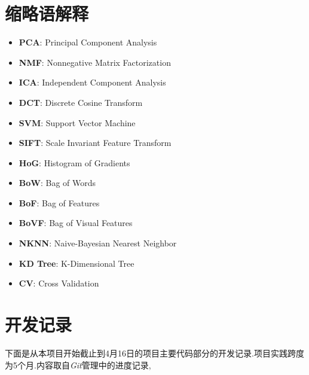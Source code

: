 

\chapter{缩略语解释}
\begin{itemize}
	\item \textbf{PCA}: Principal Component Analysis
	\item \textbf{NMF}: Nonnegative Matrix Factorization
	\item \textbf{ICA}: Independent Component Analysis
	\item \textbf{DCT}: Discrete Cosine Transform
	\item \textbf{SVM}: Support Vector Machine
	\item \textbf{SIFT}: Scale Invariant Feature Transform
	\item \textbf{HoG}: Histogram of Gradients
	\item \textbf{BoW}: Bag of Words
	\item \textbf{BoF}: Bag of Features
	\item \textbf{BoVF}: Bag of Visual Features 
	\item \textbf{NKNN}: Naive-Bayesian Nearest Neighbor
	\item \textbf{KD Tree}: K-Dimensional Tree
	\item \textbf{CV}: Cross Validation
\end{itemize}

\chapter{开发记录}
下面是从本项目开始截止到4月16日的项目主要代码部分的开发记录.项目实践跨度为5个月.内容取自\textit{Git}管理中的进度记录,




\listoftables
{}%
\listoffigures%

